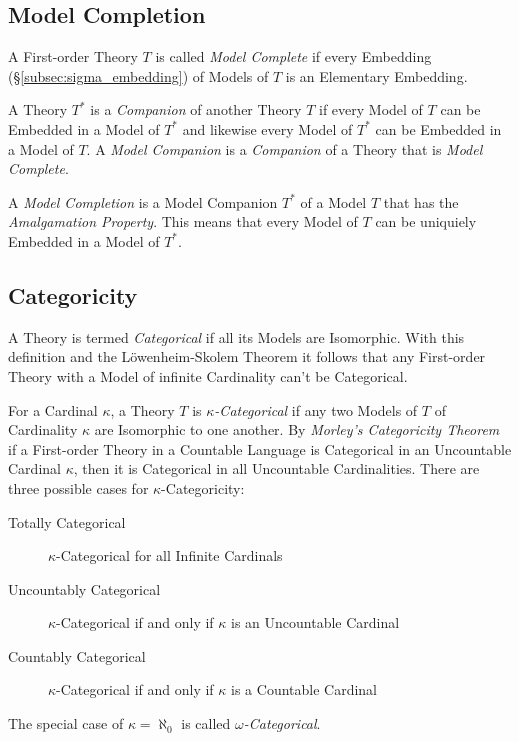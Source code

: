 \subsection{Model Completion}\label{subsec:model_completion}

A First-order Theory $T$ is called \emph{Model Complete} if every
Embedding (\S\ref{subsec:sigma_embedding}) of Models of $T$ is an
Elementary Embedding.

A Theory $T^*$ is a \emph{Companion} of another Theory $T$ if every
Model of $T$ can be Embedded in a Model of $T^*$ and likewise every
Model of $T^*$ can be Embedded in a Model of $T$. A \emph{Model
  Companion} is a \emph{Companion} of a Theory that is \emph{Model
  Complete}.

A \emph{Model Completion} is a Model Companion $T^*$ of a Model $T$
that has the \emph{Amalgamation Property}. This means that every Model
of $T$ can be uniquiely Embedded in a Model of $T^*$.

\subsection{Categoricity}

A Theory is termed \emph{Categorical} if all its Models are
Isomorphic. With this definition and the L\"owenheim-Skolem Theorem it
follows that any First-order Theory with a Model of infinite
Cardinality can't be Categorical.

For a Cardinal $\kappa$, a Theory $T$ is \emph{$\kappa$-Categorical}
if any two Models of $T$ of Cardinality $\kappa$ are Isomorphic to one
another. By \emph{Morley's Categoricity Theorem}\cite{morley65} if a
First-order Theory in a Countable Language is Categorical in an
Uncountable Cardinal $\kappa$, then it is Categorical in all
Uncountable Cardinalities. There are three possible cases for
$\kappa$-Categoricity:
\begin{description}
\item[Totally Categorical] $\kappa$-Categorical for all Infinite
  Cardinals
\item[Uncountably Categorical] $\kappa$-Categorical if and only if
  $\kappa$ is an Uncountable Cardinal
\item[Countably Categorical] $\kappa$-Categorical if and only if
  $\kappa$ is a Countable Cardinal
\end{description}
The special case of $\kappa = \aleph_0$ is called
\emph{$\omega$-Categorical}.

